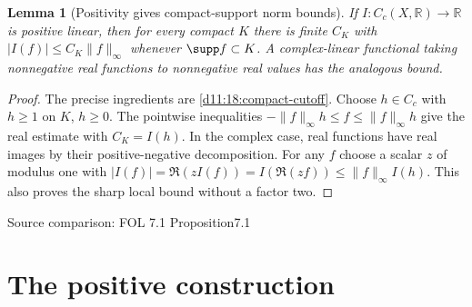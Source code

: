 \documentclass[11pt,oneside,openany]{book}
\newtheorem{lemma}[theorem]{Lemma}
\theoremstyle{definition}
\theoremstyle{remark}
\newcommand{\R}{\mathbb R}\newcommand{\C}{\mathbb C}
\newcommand{\family}[1]{}
\newcommand{\source}[1]{\par\begingroup\small\sffamily\color{black!65}Source comparison: #1\par\endgroup}
\begin{document}
\begin{lemma}[Positivity gives compact-support norm bounds]\family{D11.19.positive_functional_bound}\label{d11:19:positive-functional-bound}
If $I:C_c(X,\R)\to\R$ is positive linear, then for every compact $K$ there is finite $C_K$ with $|I(f)|\le C_K\|f\|_\infty$ whenever $\supp f\subset K$. A complex-linear functional taking nonnegative real functions to nonnegative real values has the analogous bound.
\end{lemma}
\begin{proof}
The precise ingredients are \cref{d11:18:compact-cutoff}. Choose $h\in C_c$ with $h\ge1$ on $K$, $h\ge0$. The pointwise inequalities $-\|f\|_\infty h\le f\le\|f\|_\infty h$ give the real estimate with $C_K=I(h)$. In the complex case, real functions have real images by their positive-negative decomposition. For any $f$ choose a scalar $z$ of modulus one with $|I(f)|=\Re(zI(f))=I(\Re(zf))\le\|f\|_\infty I(h)$. This also proves the sharp local bound without a factor two.
\end{proof}
\source{FOL 7.1 Proposition7.1}

\section{The positive construction}
\end{document}
